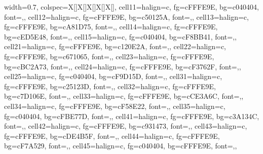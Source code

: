 \begin{table}
\centering
\begin{tblr}[         %
]                     %
{                     %
width={0.7\linewidth},
colspec={X[]X[]X[]X[]X[]},
cell{1}{1}={}{halign=c, fg=cFFFE9E, bg=c040404, font=\fontsize{0.1em}{0.4em}\selectfont,},
cell{1}{2}={}{halign=c, fg=cFFFE9E, bg=c50125A, font=\fontsize{0.5em}{0.8em}\selectfont,},
cell{1}{3}={}{halign=c, fg=cFFFE9E, bg=cA81D75, font=\fontsize{0.9em}{1.2em}\selectfont,},
cell{1}{4}={}{halign=c, fg=cFFFE9E, bg=cED5E48, font=\fontsize{1.3em}{1.6em}\selectfont,},
cell{1}{5}={}{halign=c, fg=c040404, bg=cF8BB41, font=\fontsize{1.7em}{2em}\selectfont,},
cell{2}{1}={}{halign=c, fg=cFFFE9E, bg=c120E2A, font=\fontsize{0.2em}{0.5em}\selectfont,},
cell{2}{2}={}{halign=c, fg=cFFFE9E, bg=c671065, font=\fontsize{0.6em}{0.9em}\selectfont,},
cell{2}{3}={}{halign=c, fg=cFFFE9E, bg=cBC2A73, font=\fontsize{1em}{1.3em}\selectfont,},
cell{2}{4}={}{halign=c, fg=cFFFE9E, bg=cF3762F, font=\fontsize{1.4em}{1.7em}\selectfont,},
cell{2}{5}={}{halign=c, fg=c040404, bg=cF9D15D, font=\fontsize{1.8em}{2.1em}\selectfont,},
cell{3}{1}={}{halign=c, fg=cFFFE9E, bg=c25123D, font=\fontsize{0.3em}{0.6em}\selectfont,},
cell{3}{2}={}{halign=c, fg=cFFFE9E, bg=c7D106E, font=\fontsize{0.7em}{1em}\selectfont,},
cell{3}{3}={}{halign=c, fg=cFFFE9E, bg=cCE3A6C, font=\fontsize{1.1em}{1.4em}\selectfont,},
cell{3}{4}={}{halign=c, fg=cFFFE9E, bg=cF58E22, font=\fontsize{1.5em}{1.8em}\selectfont,},
cell{3}{5}={}{halign=c, fg=c040404, bg=cFBE77D, font=\fontsize{1.9em}{2.2em}\selectfont,},
cell{4}{1}={}{halign=c, fg=cFFFE9E, bg=c3A134C, font=\fontsize{0.4em}{0.7em}\selectfont,},
cell{4}{2}={}{halign=c, fg=cFFFE9E, bg=c931473, font=\fontsize{0.8em}{1.1em}\selectfont,},
cell{4}{3}={}{halign=c, fg=cFFFE9E, bg=cDE4B5F, font=\fontsize{1.2em}{1.5em}\selectfont,},
cell{4}{4}={}{halign=c, fg=cFFFE9E, bg=cF7A529, font=\fontsize{1.6em}{1.9em}\selectfont,},
cell{4}{5}={}{halign=c, fg=c040404, bg=cFFFE9E, font=\fontsize{2em}{2.3em}\selectfont,},
}                     %

\end{tblr}
\end{table}
